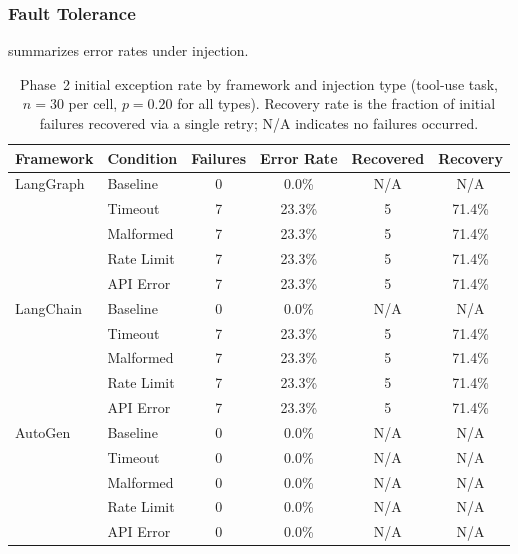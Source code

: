 \documentclass[make,article,submit,moreauthors,pdftex]{mdpi}
\begin{document}
\subsubsection{Fault Tolerance}\label{sec:phase2-fault}

 summarizes error rates under injection.

\begin{table}[htbp]
\caption{Phase~2 initial exception rate by framework and injection type (tool-use task, $n = 30$ per cell, $p = 0.20$ for all types). Recovery rate is the fraction of initial failures recovered via a single retry; N/A indicates no failures occurred.}\label{tab:phase2-error}
\centering
\begin{tabular}{llcccc}
\toprule
\textbf{Framework} & \textbf{Condition} & \textbf{Failures} & \textbf{Error Rate} & \textbf{Recovered} & \textbf{Recovery} \\
\midrule
LangGraph  & Baseline        & 0  & 0.0\%  & N/A & N/A \\
           & Timeout         & 7  & 23.3\% & 5   & 71.4\% \\
           & Malformed       & 7  & 23.3\% & 5   & 71.4\% \\
           & Rate Limit      & 7  & 23.3\% & 5   & 71.4\% \\
           & API Error       & 7  & 23.3\% & 5   & 71.4\% \\
\midrule
LangChain  & Baseline        & 0  & 0.0\%  & N/A & N/A \\
           & Timeout         & 7  & 23.3\% & 5   & 71.4\% \\
           & Malformed       & 7  & 23.3\% & 5   & 71.4\% \\
           & Rate Limit      & 7  & 23.3\% & 5   & 71.4\% \\
           & API Error       & 7  & 23.3\% & 5   & 71.4\% \\
\midrule
AutoGen    & Baseline        & 0  & 0.0\%  & N/A & N/A \\
           & Timeout         & 0  & 0.0\%  & N/A & N/A \\
           & Malformed       & 0  & 0.0\%  & N/A & N/A \\
           & Rate Limit      & 0  & 0.0\%  & N/A & N/A \\
           & API Error       & 0  & 0.0\%  & N/A & N/A \\
\bottomrule
\end{tabular}
\end{table}
\end{document}
